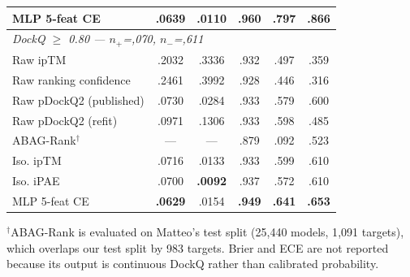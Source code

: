 \begin{table}[t]
{\begin{tabular}{lccccc}
MLP 5-feat CE & \textbf{.0639} & \textbf{.0110} & \textbf{.960} & \textbf{.797} & .866 \\
\midrule
\multicolumn{6}{l}{\textit{DockQ $\ge$ 0.80 --- $n_+$\!=\!9,070, $n_-$\!=\!53,611}} \\
Raw ipTM & .2032 & .3336 & .932 & .497 & .359 \\
Raw ranking confidence & .2461 & .3992 & .928 & .446 & .316 \\
Raw pDockQ2 (published) & .0730 & .0284 & .933 & .579 & .600 \\
Raw pDockQ2 (refit) & .0971 & .1306 & .933 & .598 & .485 \\
ABAG-Rank$^\dagger$ & --- & --- & .879 & .092 & .523 \\
Iso. ipTM & .0716 & .0133 & .933 & .599 & .610 \\
Iso. iPAE & .0700 & \textbf{.0092} & .937 & .572 & .610 \\
MLP 5-feat CE & \textbf{.0629} & .0154 & \textbf{.949} & \textbf{.641} & \textbf{.653} \\
\bottomrule
\end{tabular}
}%
\vspace{2pt}
{\footnotesize $^\dagger$ABAG-Rank is evaluated on Matteo's test split (25{,}440 models, 1{,}091 targets), which overlaps our test split by 983 targets. Brier and ECE are not reported because its output is continuous DockQ rather than calibrated probability.}
\end{table}
